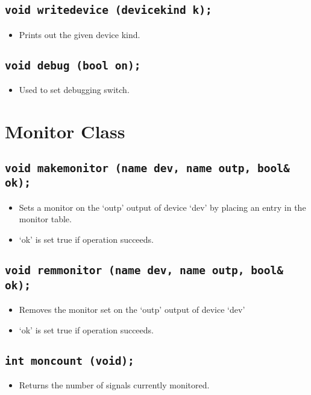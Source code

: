 \documentclass[a4paper,11pt]{article}  %
\begin{document}
\subsection*{\texttt{void writedevice (devicekind k);}}
\begin{itemize}
  \item Prints out the given device kind.
\end{itemize}

\subsection*{\texttt{void debug (bool on);}}
\begin{itemize}
  \item Used to set debugging switch.
\end{itemize}

\newpage

\section{Monitor Class}

\subsection*{\texttt{void makemonitor (name dev, name outp, bool\& ok);}}
\begin{itemize}
  \item Sets a monitor on the `outp' output of device `dev' by placing
    an entry in the monitor table.
  \item `ok' is set true if operation succeeds.
\end{itemize}

\subsection*{\texttt{void remmonitor (name dev, name outp, bool\& ok);}}
\begin{itemize}
  \item Removes the monitor set on the `outp' output of device `dev'
  \item `ok' is set true if operation succeeds.
\end{itemize}

\subsection*{\texttt{int moncount (void);}}
\begin{itemize}
  \item Returns the number of signals currently monitored.
\end{itemize}
\end{document}
